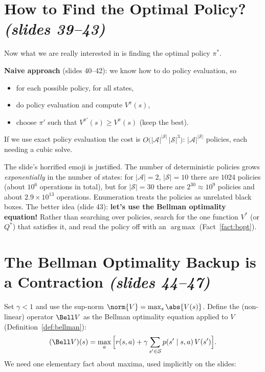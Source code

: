 \documentclass[11pt,a4paper]{article}
\DeclareMathOperator*{\argmax}{arg\,max}
\newcommand{\slides}[1]{\emph{(slides #1)}}
\newcommand{\cS}{\mathcal{S}}
\newcommand{\cA}{\mathcal{A}}
\theoremstyle{plain}
\theoremstyle{definition}
\theoremstyle{remark}
\begin{document}
\section{How to Find the Optimal Policy? \slides{39--43}}
Now what we are really interested in is finding the optimal policy $\pi^*$.

\textbf{Naive approach} (slides 40--42): we know how to do policy evaluation, so
\begin{itemize}
  \item for each possible policy, for all states,
  \item do policy evaluation and compute $V^\pi(s)$,
  \item choose $\pi'$ such that $V^{\pi'}(s)\ge V^\pi(s)$ (keep the best).
\end{itemize}
If we use exact policy evaluation the cost is $O\big(|\cA|^{|\cS|}\,|\cS|^3\big)$: $|\cA|^{|\cS|}$ policies, each needing a cubic solve.

\begin{intuition}
The slide's horrified emoji is justified. The number of deterministic policies grows \emph{exponentially} in the number of states: for $|\cA|=2$, $|\cS|=10$ there are $1024$ policies (about $10^6$ operations in total), but for $|\cS|=30$ there are $2^{30}\approx10^9$ policies and about $2.9\times10^{13}$ operations. Enumeration treats the policies as unrelated black boxes. The better idea (slide 43): \textbf{let's use the Bellman optimality equation!} Rather than searching over policies, search for the one function $V^*$ (or $Q^*$) that satisfies it, and read the policy off with an $\argmax$ (Fact~\ref{fact:bopt}).
\end{intuition}

\section{The Bellman Optimality Backup is a Contraction \slides{44--47}}\label{sec:optcontr}
Set $\gamma<1$ and use the sup-norm $\norm{V}=\max_s\abs{V(s)}$. Define the (non-linear) operator $\Bell V$ as the Bellman optimality equation applied to $V$ (Definition~\ref{def:bellman}):
\[
(\Bell V)(s)=\max_a\Big[r(s,a)+\gamma\sum_{s'\in\cS}p(s'\mid s,a)\,V(s')\Big].
\]
We need one elementary fact about maxima, used implicitly on the slides:
\end{document}
